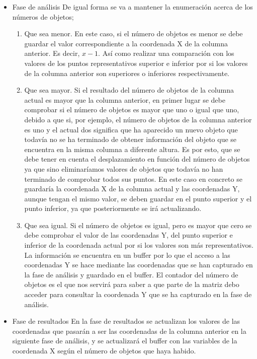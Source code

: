 \begin{itemize}
\item Fase de análisis
\subitem De igual forma se va a mantener la enumeración acerca de los números de objetos;
\begin{enumerate}
\item Que sea menor. En este caso, si el número de objetos es menor se debe guardar el valor correspondiente a la coordenada X de la columna anterior. Es decir, $x-1$. Así como realizar una comparación con los valores de los puntos representativos superior e inferior por si los valores de la columna anterior son superiores o inferiores respectivamente.
\item Que sea mayor. Si el resultado del número de objetos de la columna actual es mayor que la columna anterior, en primer lugar se debe comprobar si el número de objetos es mayor que uno o igual que uno, debido a que si, por ejemplo, el número de objetos de la columna anterior es uno y el actual dos significa que ha aparecido un nuevo objeto que todavía no se ha terminado de obtener información del objeto que se encuentra en la misma columna a diferente altura. Es por esto, que se debe tener en cuenta el desplazamiento en función del número de objetos ya que sino eliminaríamos valores de objetos que todavía no han terminado de comprobar todos sus puntos. En este caso en concreto se guardaría la coordenada X de la columna actual y las coordenadas Y, aunque tengan el mismo valor, se deben guardar en el punto superior y el punto inferior, ya que posteriormente se irá actualizando.
\item Que sea igual. Si el número de objetos es igual, pero es mayor que cero se debe comprobar el valor de las coordenadas Y, del punto superior e inferior de la coordenada actual por si los valores son más representativos. La información se encuentra en un buffer por lo que el acceso a las coordenadas Y se hace mediante las coordenadas que se han capturado en la fase de análisis y guardado en el buffer. El contador del número de objetos es el que nos servirá para saber a que parte de la matriz debo acceder para consultar la coordenada Y que se ha capturado en la fase de análisis.
\end{enumerate}
\item Fase de resultados
\subitem En la fase de resultados se actualizan los valores de las coordenadas que pasarán a ser las coordenadas de la columna anterior en la siguiente fase de análisis, y se actualizará el buffer con las variables de la coordenada X según el número de objetos que haya habido.

\end{itemize}

